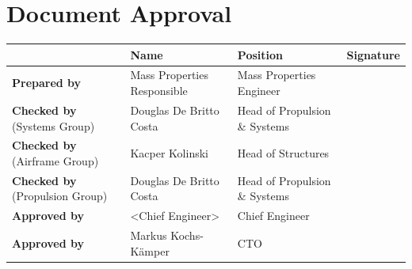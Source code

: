 \chapter*{Document Approval}

\begin{table}[h]
    \centering
    \begin{tabularx}{\textwidth}{|p{3cm}|l|X|X|}
        \hline
        & \textbf{Name} & \textbf{Position} & \textbf{Signature} \\
        \hline 
        \textbf{Prepared by} & Mass Properties Responsible & Mass Properties Engineer & \\[1.5cm]
        \hline
        \textbf{Checked by} (Systems Group) & Douglas De Britto Costa & Head of Propulsion \& Systems & \\[1.5cm]
        \hline
        \textbf{Checked by} (Airframe Group) & Kacper Kolinski & Head of Structures & \\[1.5cm]
        \hline
        \textbf{Checked by} (Propulsion Group) & Douglas De Britto Costa & Head of Propulsion \& Systems & \\[1.5cm]
        \hline
        \textbf{Approved by} & <Chief Engineer> & Chief Engineer & \\[1.5cm]
        \hline
        \textbf{Approved by} & Markus Kochs-Kämper & CTO & \\[1.5cm]
        \hline
    \end{tabularx}
\end{table}